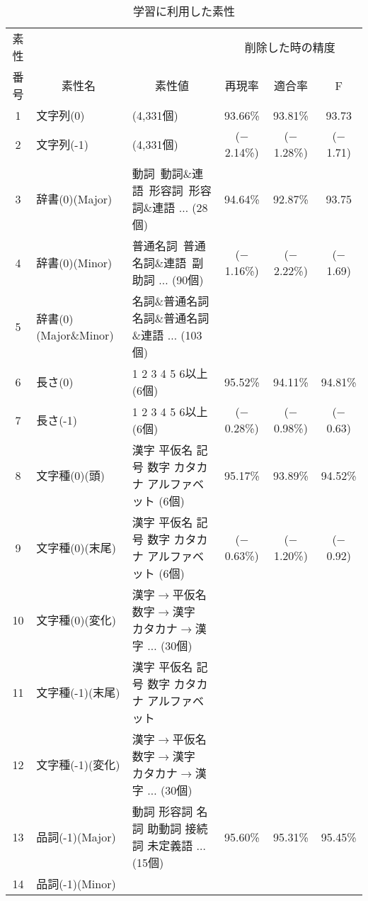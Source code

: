 \begin{table*}[htbp]
  \scriptsize
  \begin{center}
    \caption{学習に利用した素性}
    \label{table:feature}
    \leavevmode
    \begin{tabular}[c]{|c|l|p{4cm}|c|c|c|}
      \hline
      素性 & & & \multicolumn{3}{c|}{削除した時の精度}\\
      \cline{4-6}
      番号 & \multicolumn{1}{c|}{素性名} & \multicolumn{1}{c|}{素性値} 
      & 再現率 & 適合率 & F \\
      \hline
      \hline
      1 & 文字列(0) & (4,331個) & 93.66\% & 93.81\% & 93.73\\
      2 & 文字列(-1) & (4,331個) & ($-$2.14\%) & ($-$1.28\%) & ($-$1.71)\\
      \hline
      3 & 辞書(0)(Major) & 動詞\, 動詞\&連語\, 形容詞\, 形容詞\&連語 
      $\ldots$ (28個) & 94.64\% & 92.87\% & 93.75\\
      4 & 辞書(0)(Minor) & 普通名詞\, 普通名詞\&連語\, 副助詞 
      $\ldots$ (90個) & ($-$1.16\%) & ($-$2.22\%) & ($-$1.69)\\
      5 & 辞書(0)(Major\&Minor) & 名詞\&普通名詞\, 名詞\&普通名詞\&連語 
      $\ldots$ (103個) & & & \\
      \hline
      6 & 長さ(0) & 1 2 3 4 5 6以上 (6個) & 95.52\% & 94.11\% & 94.81\%\\
      7 & 長さ(-1) & 1 2 3 4 5 6以上 (6個) 
      & ($-$0.28\%) & ($-$0.98\%) & ($-$0.63)\\
      \hline
      8 & 文字種(0)(頭) & 漢字 平仮名 記号 数字 カタカナ アルファベット (6個)
      & 95.17\% & 93.89\% & 94.52\%\\
      9 & 文字種(0)(末尾) 
      & 漢字 平仮名 記号 数字 カタカナ アルファベット (6個) 
      & ($-$0.63\%) & ($-$1.20\%) & ($-$0.92)\\
      10 & 文字種(0)(変化) & 漢字$\rightarrow$平仮名\, 
      数字$\rightarrow$漢字\, カタカナ$\rightarrow$漢字 $\ldots$ (30個) 
      & & & \\
      11 & 文字種(-1)(末尾) & 漢字 平仮名 記号 数字 カタカナ アルファベット 
      & & & \\
      12 & 文字種(-1)(変化) & 漢字$\rightarrow$平仮名\, 
      数字$\rightarrow$漢字\, カタカナ$\rightarrow$漢字 $\ldots$ (30個) 
      & & & \\
      \hline
      13 & 品詞(-1)(Major) 
      & 動詞 形容詞 名詞 助動詞 接続詞 未定義語 $\ldots$ (15個) 
      & 95.60\% & 95.31\% & 95.45\%\\
      14 & 品詞(-1)(Minor) 

\end{tabular}
\end{center}
\end{table*}
